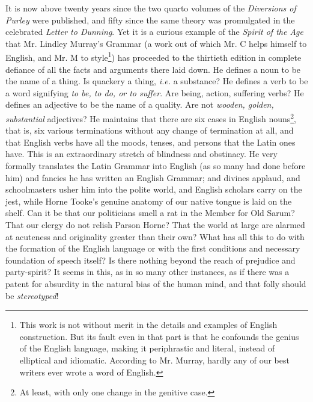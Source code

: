It is now above twenty years since the two quarto volumes of the
\emph{Diversions of Purley} were published, and fifty since the same
theory was promulgated in the celebrated \emph{Letter to Dunning}. Yet
it is a curious example of the \emph{Spirit of the Age} that
Mr. Lindley Murray's Grammar (a work out of which Mr. C  helps
himself to English, and Mr.  M  to style\footnote{This work is not without merit in the details and
examples of English construction. But its fault even in that part
is that he confounds the genius of the English language, making it
periphrastic and literal, instead of elliptical and
idiomatic. According to Mr. Murray, hardly any of our best writers
ever wrote a word of English.}) has proceeded to
the thirtieth edition in complete defiance of all the facts and
arguments there laid down. He defines a noun to be the name of a
thing. Is quackery a thing, \emph{i.e.} a substance?  He defines a verb
to be a word signifying \emph{to be, to do, or to suffer}.  Are being,
action, suffering verbs? He defines an adjective to be the name of
a quality. Are not \emph{wooden, golden, substantial} adjectives? He
maintains that there are six cases in English nouns\footnote{At least, with only one change in the genitive case.}, that is,
six various terminations without any change of termination at all,
and that English verbs have all the moods, tenses, and persons
that the Latin ones have. This is an extraordinary stretch of
blindness and obstinacy.  He very formally translates the Latin
Grammar into English (as so many had done before him) and fancies
he has written an English Grammar; and divines applaud, and
schoolmasters usher him into the polite world, and English
scholars carry on the jest, while Horne Tooke's genuine anatomy of
our native tongue is laid on the shelf. Can it be that our
politicians smell a rat in the Member for Old Sarum? That our
clergy do not relish Parson Horne? That the world at large are
alarmed at acuteness and originality greater than their own? What
has all this to do with the formation of the English language or
with the first conditions and necessary foundation of speech
itself? Is there nothing beyond the reach of prejudice and
party-spirit? It seems in this, as in so many other instances, as
if there was a patent for absurdity in the natural bias of the
human mind, and that folly should be \emph{stereotyped}!
